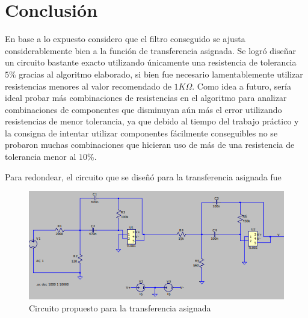 \documentclass[11pt,a4paper]{report}
\begin{document}
\section*{Conclusión}

En base a lo expuesto considero que el filtro conseguido se ajusta considerablemente bien a la función de transferencia asignada. Se logró diseñar un circuito bastante exacto utilizando únicamente una resistencia de tolerancia $5\%$ gracias al algoritmo elaborado, si bien fue necesario lamentablemente utilizar resistencias menores al valor recomendado de $1K\Omega$. Como idea a futuro, sería ideal probar más combinaciones de resistencias en el algoritmo para analizar combinaciones de componentes que disminuyan aún más el error utilizando resistencias de menor tolerancia, ya que debido al tiempo del trabajo práctico y la consigna de intentar utilizar componentes fácilmente conseguibles no se probaron muchas combinaciones que hicieran uso de más de una resistencia de tolerancia menor al $10\%$.

\bigskip
Para redondear, el circuito que se diseñó para la transferencia asignada fue

\vspace{5 mm}

\begin{figure}[h!]
\centering
\includegraphics[scale=1]{Circuito.png}
\caption{Circuito propuesto para la transferencia asignada}
\end{figure}
\end{document}
